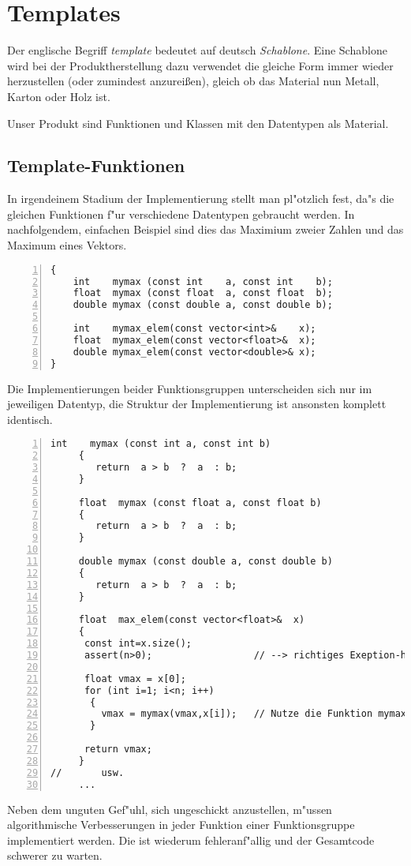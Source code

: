 \chapter{Templates}
\label{p:10}
Der englische  Begriff \emph {template} bedeutet auf deutsch \emph{Schablone}.
Eine Schablone wird bei der Produktherstellung dazu verwendet die gleiche Form immer wieder herzustellen
(oder zumindest anzureißen), gleich ob das Material nun Metall, Karton oder Holz ist.

Unser Produkt sind Funktionen und Klassen mit den Datentypen als Material.
%
\section{Template-Funktionen}
\label{p:10.1}

%
In irgendeinem Stadium der Implementierung stellt man pl"otzlich fest, da"s
die gleichen Funktionen f"ur verschiedene Datentypen gebraucht werden. In nachfolgendem,
einfachen Beispiel sind dies das Maximium zweier Zahlen und das Maximum eines Vektors.
%
\begin{lstlisting}[caption={Header:Funktion f\"ur jeden Datentyp einzeln.},label=lst:fkt_no_template_h,
basicstyle=\scriptsize,numbers=left, numberstyle=\tiny, stepnumber=2, numbersep=5pt]
{
    int    mymax (const int    a, const int    b);
    float  mymax (const float  a, const float  b);
    double mymax (const double a, const double b);

    int    mymax_elem(const vector<int>&    x);
    float  mymax_elem(const vector<float>&  x);
    double mymax_elem(const vector<double>& x);
}
\end{lstlisting}
%

Die Implementierungen beider Funktionsgruppen unterscheiden sich
nur im jeweiligen Datentyp, die Struktur der Implementierung ist ansonsten
komplett identisch.
\begin{lstlisting}[caption={Source:Funktion für jeden Datentyp einzeln.},label=lst:fkt_no_template_s,
basicstyle=\scriptsize,numbers=left, numberstyle=\tiny, stepnumber=2, numbersep=5pt]
     int    mymax (const int a, const int b)
     {
        return  a > b  ?  a  : b;
     }

     float  mymax (const float a, const float b)
     {
        return  a > b  ?  a  : b;
     }

     double mymax (const double a, const double b)
     {
        return  a > b  ?  a  : b;
     }

     float  max_elem(const vector<float>&  x)
     {
      const int=x.size();
      assert(n>0);                  // --> richtiges Exeption-handling muss rein

      float vmax = x[0];
      for (int i=1; i<n; i++)
       {
         vmax = mymax(vmax,x[i]);   // Nutze die Funktion mymax
       }

      return vmax;
     }
//       usw.
     ...
\end{lstlisting}
Neben dem unguten Gef"uhl, sich ungeschickt anzustellen, m"ussen algorithmische
Verbesserungen in jeder Funktion einer Funktionsgruppe implementiert werden.
Die ist wiederum fehleranf"allig und der Gesamtcode schwerer zu warten.

